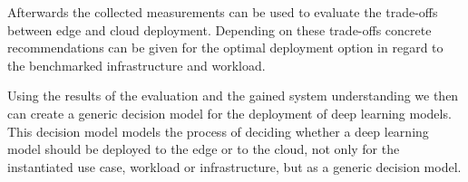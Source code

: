 Afterwards the collected measurements can be used to evaluate the trade-offs between edge and cloud deployment.
Depending on these trade-offs concrete recommendations can be given for the optimal deployment option in regard to the benchmarked infrastructure and workload.




Using the results of the evaluation and the gained system understanding we then can create a generic decision model for the deployment of deep learning models.
This decision model models the process of deciding whether a deep learning model should be deployed to the edge or to the cloud, not only for the instantiated use case, workload or infrastructure, but as a generic decision model.














\endinput 